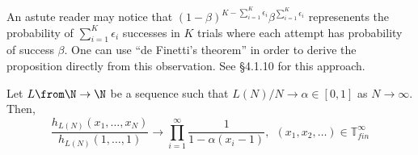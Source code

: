 \documentclass[11pt,leqno,oneside]{amsart}
\numberwithin{thm}{section}
\newcommand{\T}{\mathbb{T}} %
\begin{document}
\begin{rmk}
  An astute reader may notice that \((1-\beta)^{K-\sum_{i=1}^K
    \epsilon_i} \beta^{\sum_{i=1}^K \epsilon_i}\) represenents the
  probability of \(\sum_{i=1}^K \epsilon_i\) successes in \(K\) trials
  where each attempt has probability of success \(\beta\). One can use
  ``de Finetti's theorem'' in order to derive the proposition directly
  from this observation. See \cite{petrov}{\S 4.1.10} for this
  approach. 
\end{rmk}
\begin{prop}
  Let \(L \from \N \to \N\) be a sequence such that \(L(N)/N \to
  \alpha \in [0,1]\) as \(N \to \infty\). Then, \[
    \frac{h_{L(N)}(x_1, \ldots, x_N)}{h_{L(N)}(1, \ldots, 1)} \to
    \prod_{i=1}^\infty \frac{1}{1-\alpha(x_i-1)}, \ \ (x_1, x_2,
    \ldots) \in \T^\infty_{fin}
  \]
\end{prop}
\end{document}
